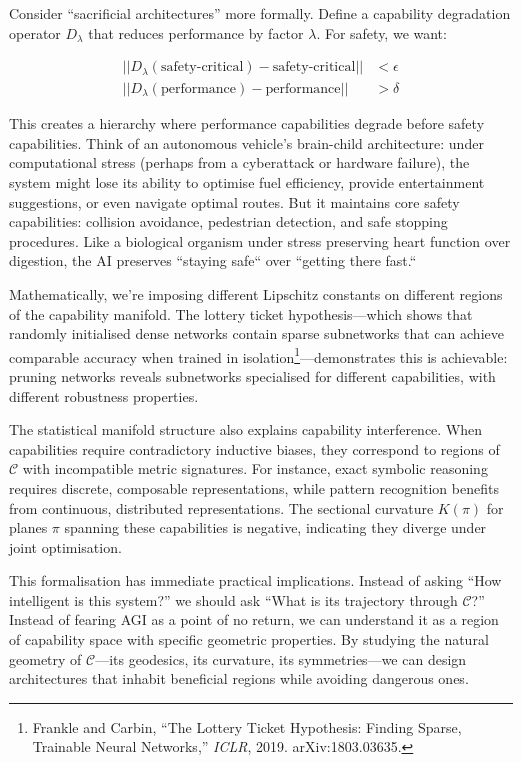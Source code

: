 \documentclass[acmsmall,screen]{acmart}
\begin{document}
Consider ``sacrificial architectures'' more formally. Define a capability degradation operator $D_\lambda$ that reduces performance by factor $\lambda$. For safety, we want:

\begin{align}
||D_\lambda(\text{safety-critical}) - \text{safety-critical}|| &< \epsilon \\
||D_\lambda(\text{performance}) - \text{performance}|| &> \delta
\end{align}

This creates a hierarchy where performance capabilities degrade before safety capabilities.
Think of an autonomous vehicle's brain-child architecture: under computational stress (perhaps from a cyberattack or hardware failure), the system might lose its ability to optimise fuel efficiency, provide entertainment suggestions, or even navigate optimal routes.
But it maintains core safety capabilities: collision avoidance, pedestrian detection, and safe stopping procedures.
Like a biological organism under stress preserving heart function over digestion, the AI preserves ``staying safe`` over ``getting there fast.``

Mathematically, we're imposing different Lipschitz constants on different regions of the capability manifold.
The lottery ticket hypothesis---which shows that randomly initialised dense networks contain sparse subnetworks that can achieve comparable accuracy when trained in isolation\footnote{Frankle and Carbin, ``The Lottery Ticket Hypothesis: Finding Sparse, Trainable Neural Networks,'' \textit{ICLR}, 2019. arXiv:1803.03635.}---demonstrates this is achievable: pruning networks reveals subnetworks specialised for different capabilities, with different robustness properties.

The statistical manifold structure also explains capability interference. When capabilities require contradictory inductive biases, they correspond to regions of $\mathcal{C}$ with incompatible metric signatures. For instance, exact symbolic reasoning requires discrete, composable representations, while pattern recognition benefits from continuous, distributed representations. The sectional curvature $K(\pi)$ for planes $\pi$ spanning these capabilities is negative, indicating they diverge under joint optimisation.

This formalisation has immediate practical implications. Instead of asking ``How intelligent is this system?'' we should ask ``What is its trajectory through $\mathcal{C}$?'' Instead of fearing AGI as a point of no return, we can understand it as a region of capability space with specific geometric properties. By studying the natural geometry of $\mathcal{C}$---its geodesics, its curvature, its symmetries---we can design architectures that inhabit beneficial regions while avoiding dangerous ones.
\end{document}
